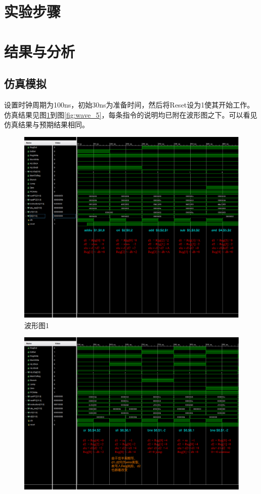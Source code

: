 \documentclass[12pt,UTF8]{ctexart}
\begin{document}
\begin{spacing}{1.1}
\section{实验步骤}



\section{结果与分析}
\subsection{仿真模拟}
\qquad 设置时钟周期为100ns，初始30ns为准备时间，然后将Reset设为1使其开始工作。仿真结果见图\ref{fig:wave_1}到图\ref{fig:wave_5}，每条指令的说明均已附在波形图之下。可以看见仿真结果与预期结果相同。
\begin{figure}[H]
\includegraphics[width=\linewidth,trim=0 260 0 0,clip]{fig/FullIns1.pdf}
\caption{波形图1}
\label{fig:wave_1}
\end{figure}
\begin{figure}[H]
\includegraphics[width=\linewidth,trim=0 50 0 0,clip]{fig/FullIns2.pdf}

\end{figure}
\end{spacing}
\end{document}
